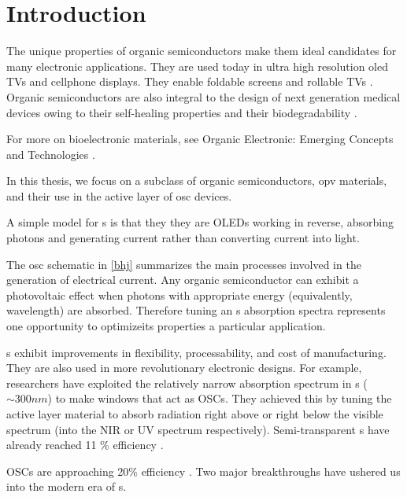 \chapter{Introduction} 

%
The unique properties of organic semiconductors make them ideal candidates for
many electronic applications.
They are used today in ultra high resolution \gls{oled} 
TVs and cellphone displays.
They enable 
foldable  screens and rollable TVs \cite{Chen2020}.
Organic semiconductors are also integral to the design of next generation medical devices owing to their
self-healing properties and their biodegradability \cite{Bettinger2010}.

For more on bioelectronic materials, see Organic Electronic: Emerging Concepts and Technologies
\cite{FabioCicoiraEditor2013}.

In this thesis, we focus on a subclass of organic semiconductors, \gls{opv} materials, and their use in the
active layer of \gls{osc} devices.
 
A simple model for s is that they they are OLEDs working in reverse, absorbing photons and generating current rather than converting current into light.

The \gls{osc} schematic in \autoref{bhj} summarizes the main processes involved in the generation of electrical current.
Any organic semiconductor can exhibit a photovoltaic effect when photons with appropriate energy (equivalently, wavelength) are absorbed.
Therefore tuning an s absorption spectra represents one opportunity to optimizeits properties a particular application.

s exhibit improvements in
flexibility, processability, and cost of manufacturing.
They are also used in more revolutionary electronic designs.
For example, researchers have exploited the relatively narrow absorption spectrum in s
(${\sim}300nm$) to make windows that act as OSCs. 
They achieved this by tuning the active layer material to absorb radiation right above or right below the
visible spectrum (into the NIR or UV spectrum respectively). 
Semi-transparent s have already
reached 11 \% efficiency \cite{Brabec2020}. 

OSCs are approaching 20\% efficiency \cite{Liu2020b}.
Two major breakthroughs have ushered us into the modern era of
s.

